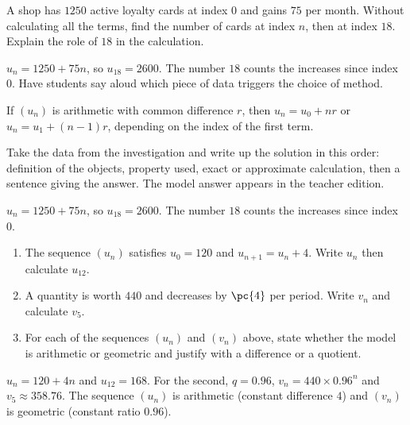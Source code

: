 \begin{activity}
A shop has $\num{1250}$ active loyalty cards at index $0$ and gains $75$ per month. Without calculating all the terms, find the number of cards at index $n$, then at index $18$. Explain the role of $18$ in the calculation.

\end{activity}
\begin{solution}$u_n=\num{1250}+75n$, so $u_{18}=\num{2600}$. The number $18$ counts the increases since index $0$. Have students say aloud which piece of data triggers the choice of method.\end{solution}

\begin{summary}If $(u_n)$ is arithmetic with common difference $r$, then $u_n=u_0+nr$ or $u_n=u_1+(n-1)r$, depending on the index of the first term.\end{summary}

\begin{example}
Take the data from the investigation and write up the solution in this order: definition of the objects, property used, exact or approximate calculation, then a sentence giving the answer. The model answer appears in the teacher edition.
\end{example}
\begin{solution}$u_n=\num{1250}+75n$, so $u_{18}=\num{2600}$. The number $18$ counts the increases since index $0$.\end{solution}

\begin{exercise}[essential]
\begin{enumerate}\item The sequence $(u_n)$ satisfies $u_0=120$ and $u_{n+1}=u_n+4$. Write $u_n$ then calculate $u_{12}$.\item A quantity is worth $440$ and decreases by $\pc{4}$ per period. Write $v_n$ and calculate $v_5$.\item For each of the sequences $(u_n)$ and $(v_n)$ above, state whether the model is arithmetic or geometric and justify with a difference or a quotient.\end{enumerate}
\end{exercise}
\begin{solution}$u_n=120+4n$ and $u_{12}=168$. For the second, $q=\num{0,96}$, $v_n=440\times\num{0,96}^n$ and $v_5\approx\num{358,76}$. The sequence $(u_n)$ is arithmetic (constant difference $4$) and $(v_n)$ is geometric (constant ratio $\num{0,96}$).\end{solution}

